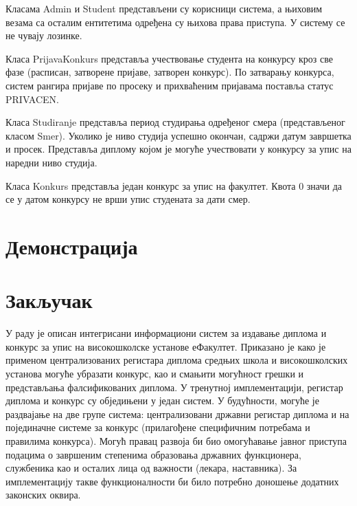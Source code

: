 \documentclass[a4paper]{article}
\begin{document}
Класама Admin и Student представљени су корисници система, а њиховим везама са осталим ентитетима одређена су њихова права приступа. У систему се не чувају лозинке.

Класа PrijavaKonkurs представља учествовање студента на конкурсу кроз све фазе (расписан, затворене пријаве, затворен конкурс).
По затварању конкурса, систем рангира пријаве по просеку и прихваћеним пријавама поставља статус PRIVACEN.

Класа Studiranje представља период студирања одређеног смера (представљеног класом Smer). Уколико је ниво студија
успешно окончан, садржи датум завршетка и просек. Представља диплому којом је могуће учествовати у конкурсу за упис
на наредни ниво студија.

Класа Konkurs представља један конкурс за упис на факултет. Квота 0 значи да се у датом конкурсу не врши упис студената за дати смер.

\section*{Демонстрација}

\section*{Закључак}

У раду је описан интегрисани информациони систем за издавање диплома и конкурс за упис на високошколске установе еФакултет.
Приказано је како је применом централизованих регистара диплома средњих школа и високошколских установа могуће убразати
конкурс, као и смањити могућност грешки и представљања фалсификованих диплома. У тренутној имплементацији, регистар диплома
и конкурс су обједињени у један систем. У будућности, могуће је раздвајање на две групе система:
централизовани државни регистар диплома и на појединачне системе за конкурс (прилагођене специфичним потребама и
правилима конкурса). Могућ правац развоја би био омогућавање јавног приступа подацима о завршеним степенима образовања
државних функционера, службеника као и осталих лица од важности (лекара, наставника). За имплементацију такве функционалности
би било потребно доношење додатних законских оквира.



\end{document}
